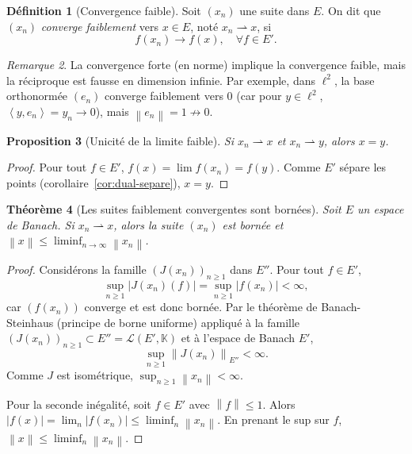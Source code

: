 \documentclass[a4paper,12pt]{book}
\newcommand{\K}{\mathbb{K}}
\newcommand{\norm}[1]{\left\| #1 \right\|}
\newcommand{\abs}[1]{\left| #1 \right|}
\newcommand{\inner}[2]{\left\langle #1, #2 \right\rangle}
\newcommand{\weakto}{\rightharpoonup}
\theoremstyle{definition}
\newtheorem{definition}{Définition}[chapter]
\theoremstyle{plain}
\newtheorem{theoreme}[definition]{Théorème}
\newtheorem{proposition}[definition]{Proposition}
\theoremstyle{remark}
\newtheorem{remarque}[definition]{Remarque}
\begin{document}

\begin{definition}[Convergence faible]
\label{def:conv-faible}
\index{weakto@$\weakto$}
Soit $(x_n)$ une suite dans $E$. On dit que $(x_n)$ \emph{converge faiblement}
vers $x \in E$, noté $x_n \weakto x$, si
\[
  f(x_n) \to f(x), \quad \forall f \in E'.
\]
\end{definition}

\begin{remarque}
\label{rem:conv-forte-implique-faible}
La convergence forte (en norme) implique la convergence faible, mais la réciproque
est fausse en dimension infinie. Par exemple, dans $\ell^2$, la base orthonormée
$(e_n)$ converge faiblement vers $0$ (car pour $y \in \ell^2$,
$\inner{y}{e_n} = y_n \to 0$), mais $\norm{e_n} = 1 \not\to 0$.
\end{remarque}

\begin{proposition}[Unicité de la limite faible]
\label{prop:unicite-limite-faible}
Si $x_n \weakto x$ et $x_n \weakto y$, alors $x = y$.
\end{proposition}

\begin{proof}
Pour tout $f \in E'$, $f(x) = \lim f(x_n) = f(y)$. Comme $E'$ sépare les points
(corollaire~\ref{cor:dual-separe}), $x = y$.
\end{proof}

\begin{theoreme}[Les suites faiblement convergentes sont bornées]
\label{thm:faible-borne}
Soit $E$ un espace de Banach. Si $x_n \weakto x$, alors la suite $(x_n)$ est
bornée et $\norm{x} \le \liminf_{n \to \infty} \norm{x_n}$.
\end{theoreme}

\begin{proof}
Considérons la famille $(J(x_n))_{n \ge 1}$ dans $E''$. Pour tout $f \in E'$,
\[
  \sup_{n \ge 1} \abs{J(x_n)(f)} = \sup_{n \ge 1} \abs{f(x_n)} < \infty,
\]
car $(f(x_n))$ converge et est donc bornée. Par le théorème de Banach-Steinhaus
(principe de borne uniforme) appliqué à la famille
$(J(x_n))_{n \ge 1} \subset E'' = \mathcal{L}(E', \K)$
et à l'espace de Banach $E'$,
\[
  \sup_{n \ge 1} \norm{J(x_n)}_{E''} < \infty.
\]
Comme $J$ est isométrique, $\sup_{n \ge 1} \norm{x_n} < \infty$.

Pour la seconde inégalité, soit $f \in E'$ avec $\norm{f} \le 1$. Alors
$\abs{f(x)} = \lim_n \abs{f(x_n)} \le \liminf_n \norm{x_n}$.
En prenant le sup sur $f$, $\norm{x} \le \liminf_n \norm{x_n}$.
\end{proof}
\end{document}
